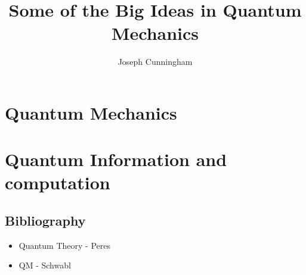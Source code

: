 \documentclass{report}
\title{Some of the Big Ideas in Quantum Mechanics}
\author{Joseph Cunningham}
\date{}
\begin{document}
\maketitle
\tableofcontents

\part{Quantum Mechanics}
\setcounter{chapter}{0} %


\part{Quantum Information and computation}
\setcounter{chapter}{0} %


\appendix

\chapter{Bibliography}
\begin{itemize}
\item Quantum Theory - Peres
\item QM - Schwabl
\end{itemize}
\end{document}

